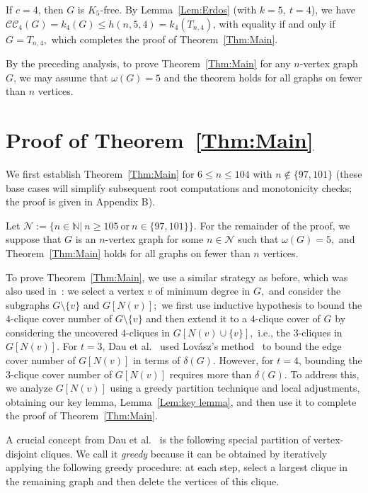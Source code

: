 \documentclass[11pt,a4paper]{article}
\newcommand{\dN}{{\mathcal{N}}}
\newcommand{\turangraph}[2]{T_{#1,#2}}
\newcommand{\coveropt}[2]{{\mathcal{C}\mathcal{C}_{#1}(#2)}}
\begin{document}
If $c = 4$, then $G$ is $K_5$-free. 
By Lemma~\ref{Lem:Erdos} (with $k=5,\ t=4$), we have
$\coveropt{4}{G} = k_4(G) \leq h(n,5,4) = k_4(\turangraph{n}{4})$, 
with equality if and only if $G =\turangraph{n}{4},$ which completes the proof of Theorem~\ref{Thm:Main}.

By the preceding analysis, 
to prove Theorem~\ref{Thm:Main} for any $n$-vertex graph $G$, 
we may assume that $\omega(G) = 5$ and the theorem holds for all graphs on fewer than $n$ vertices.



\section{Proof of Theorem~\ref{Thm:Main}}\label{Sec:Proof of main Theorem}
We first establish Theorem~\ref{Thm:Main} for $6 \leq n \leq 104$ with $n \not\in \{97,101\}$ (these base cases will simplify subsequent root computations and monotonicity checks; the proof is given in Appendix B).

Let $\mathcal{N}:= \{n\in \mathbb{N}|\ n\ge 105\ \text{or}\  n\in \{97,101\} \}.$
For the remainder of the proof, 
we suppose that $G$ is an $n$-vertex graph for some $n\in \dN$ such that $\omega(G)=5,$ and
Theorem~\ref{Thm:Main} holds for all graphs on fewer than $n$ vertices.

To prove Theorem~\ref{Thm:Main}, 
we use a similar strategy as before, which was also used in~\cite{DMP}: 
we select a vertex $v$ of minimum degree in $G,$ 
and consider the subgraphs $G\setminus\{v\}$ and $G[N(v)];$ 
we first use inductive hypothesis to bound the $4$-clique cover number of $G\setminus\{v\}$ and then extend it to a $4$-clique cover of $G$ by considering the uncovered $4$-cliques in $G[N(v)\cup\{v\}],$ i.e., the $3$-cliques in $G[N(v)].$
For $t=3$, Dau et al.~\cite{DMP} used Lov\'{a}sz's method~\cite{L68} to bound the edge cover number of $G[N(v)]$ in terms of $\delta(G)$. 
However, for $t=4$, bounding the 3-clique cover number of $G[N(v)]$ requires more than $\delta(G)$. 
To address this, we analyze $G[N(v)]$ using a greedy partition technique and local adjustments, obtaining our key lemma, Lemma~\ref{Lem:key lemma}, and then use it to complete the proof of Theorem~\ref{Thm:Main}.
\medskip

A crucial concept from Dau et al.~\cite{DMP} is the following special partition of vertex-disjoint cliques.  
We call it {\it greedy} because it can be obtained by iteratively applying the following greedy procedure: at each step, select a largest clique in the remaining graph and then delete the vertices of this clique.
\end{document}
